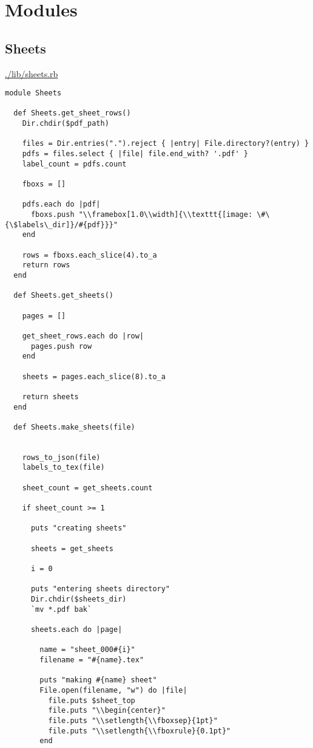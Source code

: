 \documentclass[11pt]{article}
\begin{document}
\section{Modules}
\label{sec-5}

\subsection{Sheets}
\label{sec-5-1}

\url{./lib/sheets.rb}

\begin{verbatim}
module Sheets

  def Sheets.get_sheet_rows()
    Dir.chdir($pdf_path)

    files = Dir.entries(".").reject { |entry| File.directory?(entry) }
    pdfs = files.select { |file| file.end_with? '.pdf' }
    label_count = pdfs.count

    fboxs = []

    pdfs.each do |pdf|
      fboxs.push "\\framebox[1.0\\width]{\\texttt{[image: \#\{\$labels\_dir]}/#{pdf}}}"
    end

    rows = fboxs.each_slice(4).to_a
    return rows
  end

  def Sheets.get_sheets()

    pages = []

    get_sheet_rows.each do |row|
      pages.push row
    end

    sheets = pages.each_slice(8).to_a

    return sheets
  end

  def Sheets.make_sheets(file)


    rows_to_json(file)
    labels_to_tex(file)

    sheet_count = get_sheets.count

    if sheet_count >= 1

      puts "creating sheets"

      sheets = get_sheets

      i = 0

      puts "entering sheets directory"
      Dir.chdir($sheets_dir)
      `mv *.pdf bak`

      sheets.each do |page|

        name = "sheet_000#{i}"
        filename = "#{name}.tex" 

        puts "making #{name} sheet"
        File.open(filename, "w") do |file|
          file.puts $sheet_top
          file.puts "\\begin{center}"
          file.puts "\\setlength{\\fboxsep}{1pt}"
          file.puts "\\setlength{\\fboxrule}{0.1pt}"
        end


\end{verbatim}
\end{document}
